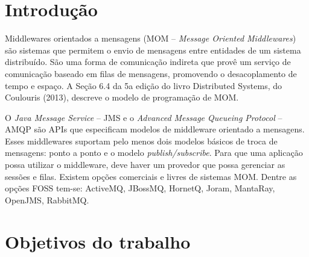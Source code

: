 \documentclass[12pt,brazil, a4paper, fullpage]{article}
\begin{document}
    \lstset{language=Java,
        basicstyle=\small, %
        showstringspaces=false}

\thispagestyle{plain}





\section{Introdução}

Middlewares orientados a mensagens (MOM – \textit{Message Oriented Middlewares}) são sistemas que permitem o envio de mensagens entre entidades de um sistema distribuído. São uma forma de comunicação indireta que provê um serviço de comunicação baseado em filas de mensagens, promovendo o desacoplamento de tempo e espaço. A Seção 6.4 da 5a edição do livro Distributed Systems, do Coulouris (2013), descreve o modelo de programação de MOM.

O \textit{Java Message Service} – JMS e o \textit{Advanced Message Queueing Protocol} – AMQP são APIs que especificam modelos de middleware orientado a mensagens. Esses middlewares suportam pelo menos dois modelos básicos de troca de mensagens: ponto a ponto e o modelo \textit{publish/subscribe}. Para que uma aplicação possa utilizar o middleware, deve haver um provedor que possa gerenciar as sessões e filas. Existem opções comerciais e livres de sistemas MOM. Dentre as opções FOSS tem-se: ActiveMQ, JBossMQ, HornetQ, Joram, MantaRay, OpenJMS, RabbitMQ.



\section{Objetivos do trabalho}
\end{document}
